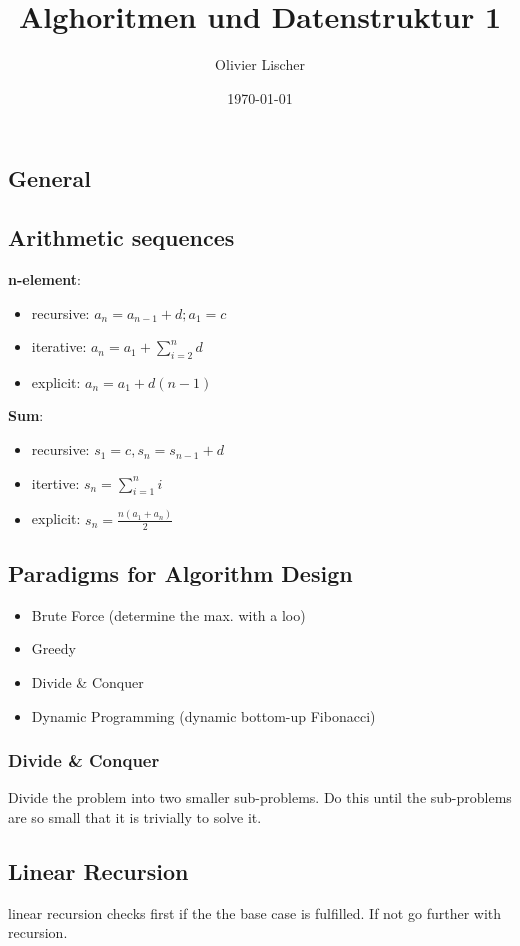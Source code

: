 \documentclass[11pt,twoside,landscape]{article}
\author{Olivier Lischer}
\date{\today}
\title{Alghoritmen und Datenstruktur 1}
\begin{document}
\maketitle
\begin{multicols}{2}
\section*{General}
\label{sec:orgc9f6d8c}
\subsection*{Arithmetic sequences}
\label{sec:org89a2ea8}
\textbf{n-element}:
\begin{itemize}
\item recursive: \(a_n = a_{n-1} + d; a_1 = c\)
\item iterative: \(a_n = a_1 + \sum_{i=2}^n d\)
\item explicit: \(a_n = a_1 + d(n-1)\)
\end{itemize}

\textbf{Sum}:
\begin{itemize}
\item recursive: \(s_1 = c, s_n = s_{n-1} + d\)
\item itertive: \(s_n = \sum_{i=1}^{n}i\)
\item explicit: \(s_n = \frac{n(a_1 + a_n)}{2}\)
\end{itemize}
\subsection*{Paradigms for Algorithm Design}
\label{sec:orga42c2bd}
\begin{itemize}
\item Brute Force (determine the max. with a loo)
\item Greedy
\item Divide \& Conquer
\item Dynamic Programming (dynamic bottom-up Fibonacci)
\end{itemize}

\subsubsection*{Divide \& Conquer}
\label{sec:org2077bf9}
Divide the problem into two smaller sub-problems. Do this until the sub-problems are so small that it is trivially to solve it.

\subsection*{Linear Recursion}
\label{sec:org097cfdf}
linear recursion checks first if the the base case is fulfilled. If not go further with recursion.


\end{multicols}
\end{document}
